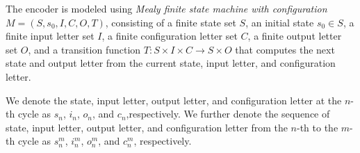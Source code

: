 \documentclass[journal]{IEEEtran}
\begin{document}
The encoder is modeled using \emph{Mealy finite state machine with configuration} $M=(S,s_0,I,C,O,T)$,
consisting of a finite state set $S$,
an initial state $s_0\in S$,
a finite input letter set $I$,
a finite configuration letter set $C$,
a finite output letter set $O$,
and a transition function $T: S\times I\times C\to S\times O$ that computes the next state
and output letter from the current state,
input letter,
and configuration letter.


We denote the state, input letter, output letter, and configuration letter at the $n$-th cycle as $s_n$, $i_n$, $o_n$, and $c_n$,respectively.
We further denote the sequence of state, input letter, output letter, and configuration letter from the $n$-th to the $m$-th cycle as $s_n^m$, $i_n^m$, $o_n^m$, and $c_n^m$, respectively.

\end{document}
